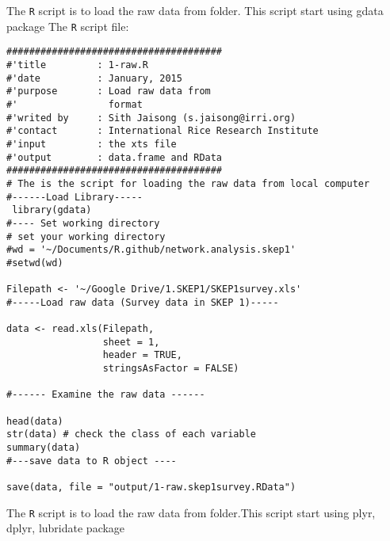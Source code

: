 \documentclass[idxtotoc,hyperref,openany]{labbook} %
\begin{document}
The {\tt{R}} script is to load the raw data from folder. This script start using gdata package \cite{package:gdata}\newline
\lstset{language=R}
The {\tt{R}} script file:
\begin{lstlisting}
######################################
#'title         : 1-raw.R
#'date          : January, 2015
#'purpose       : Load raw data from 
#'                format
#'writed by     : Sith Jaisong (s.jaisong@irri.org)
#'contact       : International Rice Research Institute
#'input         : the xts file                
#'output        : data.frame and RData 
######################################
# The is the script for loading the raw data from local computer
#------Load Library-----
 library(gdata)
#---- Set working directory 
# set your working directory
#wd = '~/Documents/R.github/network.analysis.skep1' 
#setwd(wd)

Filepath <- '~/Google Drive/1.SKEP1/SKEP1survey.xls'
#-----Load raw data (Survey data in SKEP 1)-----

data <- read.xls(Filepath, 
                 sheet = 1, 
                 header = TRUE,
                 stringsAsFactor = FALSE)

#------ Examine the raw data ------

head(data) 
str(data) # check the class of each variable
summary(data)
#---save data to R object ----

save(data, file = "output/1-raw.skep1survey.RData")

\end{lstlisting}



The {\tt{R}} script is to load the raw data from folder.This script start using plyr, dplyr, lubridate package \cite{package:plyr, package:dplyr, package:lubridate}\newline
\end{document}
